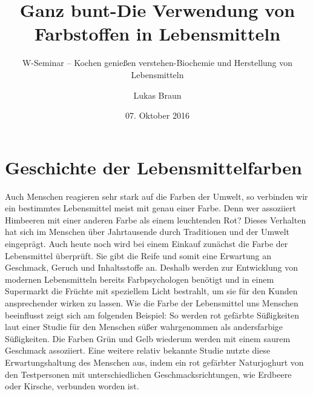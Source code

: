 \documentclass[11pt]{scrreprt}
\title{Ganz bunt-Die Verwendung von Farbstoffen in Lebensmitteln}
\author{Lukas Braun}
\subtitle{W-Seminar -- Kochen genießen verstehen-Biochemie und Herstellung von Lebensmitteln}
\date{07. Oktober 2016}
\begin{document}
\pagestyle{empty}
\renewcommand{\abstractname}{Abstract}
\maketitle
\pagestyle{empty}
\clearpage
{}

\begin{abstract}
	\noindent

\end{abstract}
\pagestyle{empty}
\clearpage
\pagestyle{empty}
\tableofcontents
\clearpage
\pagestyle{empty}
\begingroup
\makeatletter
\let\ps@plain\ps@empty
\makeatother

\pagestyle{empty}
\listoffigures
\cleardoublepage
\endgroup
\clearpage
\pagestyle{headings}


\chapter{Geschichte der Lebensmittelfarben}
Auch Menschen reagieren sehr stark auf die Farben der Umwelt, so verbinden wir ein bestimmtes Lebensmittel meist mit genau einer Farbe. Denn wer assoziiert Himbeeren mit einer anderen Farbe als einem leuchtenden Rot? Dieses Verhalten hat sich im Menschen über Jahrtausende durch Traditionen und der Umwelt eingeprägt. Auch heute noch wird bei einem Einkauf zunächst die Farbe der Lebensmittel überprüft. Sie gibt die Reife und somit eine Erwartung an Geschmack, Geruch und Inhaltsstoffe an. Deshalb werden zur Entwicklung von modernen Lebensmitteln bereits Farbpsychologen benötigt und in einem Supermarkt die Früchte mit speziellem Licht bestrahlt, um sie für den Kunden ansprechender wirken zu lassen\parencite{Hamatschek.2016}.
Wie die Farbe der Lebensmittel uns Menschen beeinflusst zeigt sich am folgenden Beispiel: So werden rot gefärbte Süßigkeiten laut einer Studie für den Menschen süßer wahrgenommen als andersfarbige Süßigkeiten. Die Farben Grün und Gelb wiederum werden mit einem saurem Geschmack assoziiert. Eine weitere relativ bekannte Studie nutzte diese Erwartungshaltung des Menschen aus, indem ein rot gefärbter Naturjoghurt von den Testpersonen mit unterschiedlichen Geschmacksrichtungen, wie Erdbeere oder Kirsche, verbunden worden ist.
\end{document}
